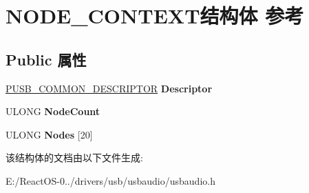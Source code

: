 \hypertarget{struct_n_o_d_e___c_o_n_t_e_x_t}{}\section{N\+O\+D\+E\+\_\+\+C\+O\+N\+T\+E\+X\+T结构体 参考}
\label{struct_n_o_d_e___c_o_n_t_e_x_t}
\subsection*{Public 属性}
\begin{DoxyCompactItemize}
\item 
\mbox{\label{struct_n_o_d_e___c_o_n_t_e_x_t_a7ca0e8d4b7273bb2577061e000a41d09}} 
\hyperlink{struct___u_s_b___c_o_m_m_o_n___d_e_s_c_r_i_p_t_o_r}{P\+U\+S\+B\+\_\+\+C\+O\+M\+M\+O\+N\+\_\+\+D\+E\+S\+C\+R\+I\+P\+T\+OR} {\bfseries Descriptor}
\item 
\mbox{\label{struct_n_o_d_e___c_o_n_t_e_x_t_a37e56875a9eaa6263299684a64a54640}} 
U\+L\+O\+NG {\bfseries Node\+Count}
\item 
\mbox{\label{struct_n_o_d_e___c_o_n_t_e_x_t_a31ae382d27ce36fa5200b4bb4b32931b}} 
U\+L\+O\+NG {\bfseries Nodes} \mbox{[}20\mbox{]}
\end{DoxyCompactItemize}


该结构体的文档由以下文件生成\+:\begin{DoxyCompactItemize}
\item 
E\+:/\+React\+O\+S-\/0../drivers/usb/usbaudio/usbaudio.\+h\end{DoxyCompactItemize}
